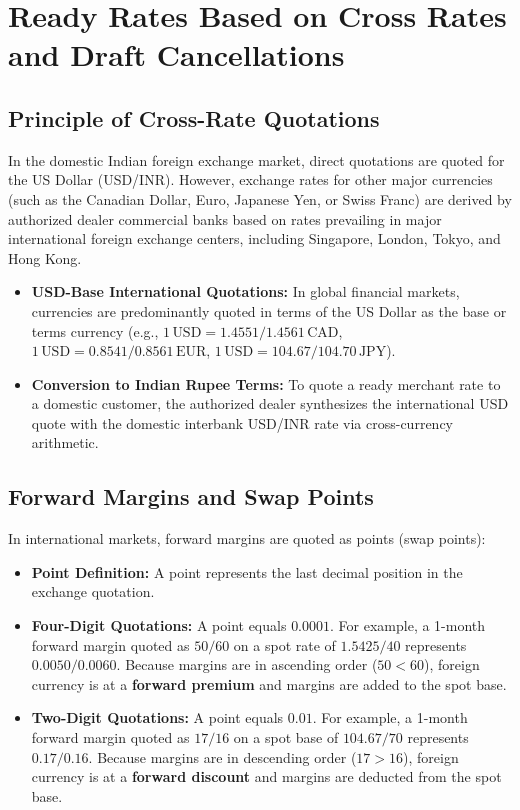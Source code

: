 \section{Ready Rates Based on Cross Rates and Draft Cancellations}

\subsection{Principle of Cross-Rate Quotations}
In the domestic Indian foreign exchange market, direct quotations are quoted for the US Dollar (USD/INR). However, exchange rates for other major currencies (such as the Canadian Dollar, Euro, Japanese Yen, or Swiss Franc) are derived by authorized dealer commercial banks based on rates prevailing in major international foreign exchange centers, including Singapore, London, Tokyo, and Hong Kong.

\begin{itemize}[leftmargin=*]
    \item \textbf{USD-Base International Quotations:} In global financial markets, currencies are predominantly quoted in terms of the US Dollar as the base or terms currency (e.g., $1\,\text{USD} = 1.4551 / 1.4561\,\text{CAD}$, $1\,\text{USD} = 0.8541 / 0.8561\,\text{EUR}$, $1\,\text{USD} = 104.67 / 104.70\,\text{JPY}$).
    \item \textbf{Conversion to Indian Rupee Terms:} To quote a ready merchant rate to a domestic customer, the authorized dealer synthesizes the international USD quote with the domestic interbank USD/INR rate via cross-currency arithmetic.
\end{itemize}

\subsection{Forward Margins and Swap Points}
In international markets, forward margins are quoted as points (swap points):
\begin{itemize}[leftmargin=*]
    \item \textbf{Point Definition:} A point represents the last decimal position in the exchange quotation.
    \item \textbf{Four-Digit Quotations:} A point equals $0.0001$. For example, a 1-month forward margin quoted as $50/60$ on a spot rate of $1.5425/40$ represents $0.0050 / 0.0060$. Because margins are in ascending order ($50 < 60$), foreign currency is at a \textbf{forward premium} and margins are added to the spot base.
    \item \textbf{Two-Digit Quotations:} A point equals $0.01$. For example, a 1-month forward margin quoted as $17/16$ on a spot base of $104.67/70$ represents $0.17 / 0.16$. Because margins are in descending order ($17 > 16$), foreign currency is at a \textbf{forward discount} and margins are deducted from the spot base.
\end{itemize}

